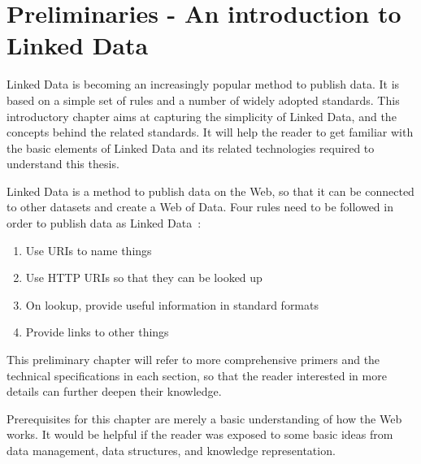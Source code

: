 \chapter{Preliminaries - An introduction to Linked Data}


Linked Data is becoming an increasingly popular method to publish data.
It is based on a simple set of rules and a number of widely adopted standards.
This introductory chapter aims at capturing the simplicity of Linked Data, and the concepts behind the related standards.
It will help the reader to get familiar with the basic elements of Linked Data and its related technologies required to understand this thesis.

Linked Data is a method to publish data on the Web, so that it can be connected to other datasets and create a Web of Data.
Four rules need to be followed in order to publish data as Linked Data~\cite{linkeddata-rules}:

\begin{enumerate}
\item Use URIs to name things
\item Use HTTP URIs so that they can be looked up
\item On lookup, provide useful information in standard formats
\item Provide links to other things
\end{enumerate}

This preliminary chapter will refer to more comprehensive primers and the technical specifications in each section, so that the reader interested in more details can further deepen their knowledge.

Prerequisites for this chapter are merely a basic understanding of how the Web works.
It would be helpful if the reader was exposed to some basic ideas from data management, data structures, and knowledge representation.

